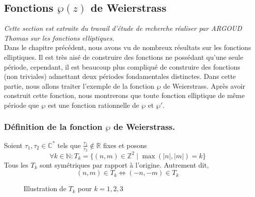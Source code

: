 \documentclass[12pt]{article}
\begin{document}
    \subsection{Fonctions $\wp(z)$ de Weierstrass}
    \textit{Cette section est extraite du travail d'étude de recherche réaliser par ARGOUD Thomas  sur les fonctions elliptiques.} \\
    Dans le chapitre précédent, nous avons vu de nombreux résultats sur les fonctions elliptiques. Il est très aisé de construire des fonctions ne possédant qu'une seule période, cependant, il est beaucoup plus compliqué de construire des fonctions (non triviales) admettant deux périodes fondamentales distinctes. Dans cette partie, nous allons traiter l'exemple de la fonction $\wp$ de Weierstrass. Après avoir construit cette fonction, nous montrerons que toute fonction elliptique de même période que $\wp$ est une fonction rationnelle de $\wp$ et $\wp'$.
    
    \subsubsection{Définition de la fonction $\wp$ de Weierstrass.}
    
    Soient $\tau_1, \tau_2 \in \mathbb{C}^*$ tels que $\frac{\tau_1}{\tau_2} \notin \mathbb{R}$ fixes et posons
    \[
    \forall k \in \mathbb{N} : T_k = \{(n,m) \in \mathbb{Z}^2 \mid \max(|n|,|m|) = k\}
    \]
    Tous les $T_k$ sont symétriques par rapport à l'origine. Autrement dit,
    \[
    (n,m) \in T_k \iff (-n,-m) \in T_k
    \]
    
    \begin{figure}[h]
        \centering
        \caption{Illustration de \( T_k \) pour \( k=1,2,3 \)}
        \label{fig:Tk}
    \end{figure}
    
\end{document}
